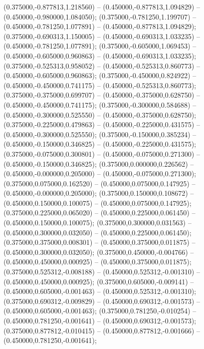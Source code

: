  (0.375000,-0.877813,1.218560) -- (0.450000,-0.877813,1.094829) -- (0.450000,-0.980000,1.084050);
 (0.375000,-0.781250,1.199707) -- (0.450000,-0.781250,1.077891) -- (0.450000,-0.877813,1.094829);
 (0.375000,-0.690313,1.150005) -- (0.450000,-0.690313,1.033235) -- (0.450000,-0.781250,1.077891);
 (0.375000,-0.605000,1.069453) -- (0.450000,-0.605000,0.960863) -- (0.450000,-0.690313,1.033235);
 (0.375000,-0.525313,0.958052) -- (0.450000,-0.525313,0.860773) -- (0.450000,-0.605000,0.960863);
 (0.375000,-0.450000,0.824922) -- (0.450000,-0.450000,0.741175) -- (0.450000,-0.525313,0.860773);
 (0.375000,-0.375000,0.699707) -- (0.450000,-0.375000,0.628750) -- (0.450000,-0.450000,0.741175);
 (0.375000,-0.300000,0.584688) -- (0.450000,-0.300000,0.525550) -- (0.450000,-0.375000,0.628750);
 (0.375000,-0.225000,0.479863) -- (0.450000,-0.225000,0.431575) -- (0.450000,-0.300000,0.525550);
 (0.375000,-0.150000,0.385234) -- (0.450000,-0.150000,0.346825) -- (0.450000,-0.225000,0.431575);
 (0.375000,-0.075000,0.300801) -- (0.450000,-0.075000,0.271300) -- (0.450000,-0.150000,0.346825);
 (0.375000,0.000000,0.226562) -- (0.450000,-0.000000,0.205000) -- (0.450000,-0.075000,0.271300);
 (0.375000,0.075000,0.162520) -- (0.450000,0.075000,0.147925) -- (0.450000,-0.000000,0.205000);
 (0.375000,0.150000,0.108672) -- (0.450000,0.150000,0.100075) -- (0.450000,0.075000,0.147925);
 (0.375000,0.225000,0.065020) -- (0.450000,0.225000,0.061450) -- (0.450000,0.150000,0.100075);
 (0.375000,0.300000,0.031563) -- (0.450000,0.300000,0.032050) -- (0.450000,0.225000,0.061450);
 (0.375000,0.375000,0.008301) -- (0.450000,0.375000,0.011875) -- (0.450000,0.300000,0.032050);
 (0.375000,0.450000,-0.004766) -- (0.450000,0.450000,0.000925) -- (0.450000,0.375000,0.011875);
 (0.375000,0.525312,-0.008188) -- (0.450000,0.525312,-0.001310) -- (0.450000,0.450000,0.000925);
 (0.375000,0.605000,-0.009141) -- (0.450000,0.605000,-0.001463) -- (0.450000,0.525312,-0.001310);
 (0.375000,0.690312,-0.009829) -- (0.450000,0.690312,-0.001573) -- (0.450000,0.605000,-0.001463);
 (0.375000,0.781250,-0.010254) -- (0.450000,0.781250,-0.001641) -- (0.450000,0.690312,-0.001573);
 (0.375000,0.877812,-0.010415) -- (0.450000,0.877812,-0.001666) -- (0.450000,0.781250,-0.001641);
